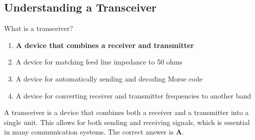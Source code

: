 \subsection{Understanding a Transceiver}
\label{T7A02}

\begin{tcolorbox}[colback=gray!10!white,colframe=black!75!black,title=T7A02]
What is a transceiver?
\begin{enumerate}[noitemsep]
    \item \textbf{A device that combines a receiver and transmitter}
    \item A device for matching feed line impedance to 50 ohms
    \item A device for automatically sending and decoding Morse code
    \item A device for converting receiver and transmitter frequencies to another band
\end{enumerate}
\end{tcolorbox}

A transceiver is a device that combines both a receiver and a transmitter into a single unit. This allows for both sending and receiving signals, which is essential in many communication systems. The correct answer is \textbf{A}.